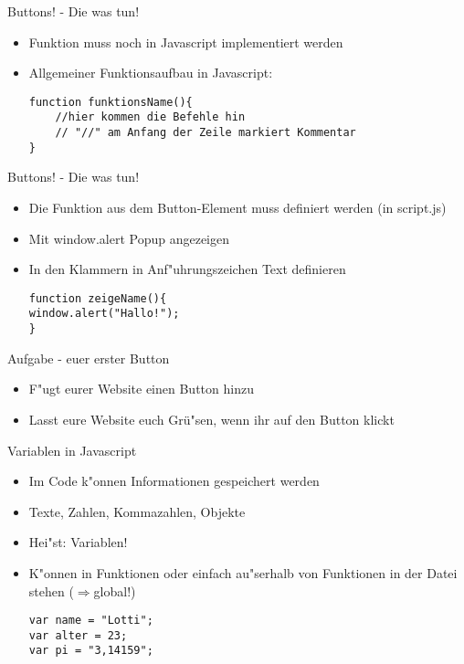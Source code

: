 \documentclass[18pt]{beamer}
\begin{document}
\begin{frame}[fragile]{Buttons! - Die was tun!}
\begin {itemize}
\item Funktion muss noch in Javascript implementiert werden
\item Allgemeiner Funktionsaufbau in Javascript:
\begin{lstlisting}
function funktionsName(){
	//hier kommen die Befehle hin
	// "//" am Anfang der Zeile markiert Kommentar
}
\end{lstlisting}
\end {itemize}
\end{frame}




\begin{frame}[fragile]{Buttons! - Die was tun!}
\begin {itemize}
\item Die Funktion aus dem Button-Element muss definiert werden (in script.js)
\item  Mit window.alert Popup angezeigen
\item In den Klammern in Anf"uhrungszeichen Text definieren
\begin{lstlisting}
function zeigeName(){
window.alert("Hallo!");
}
\end{lstlisting}
\end {itemize}
\end{frame}



\begin{frame}[fragile]{Aufgabe - euer erster Button}
\begin {itemize}
\item F"ugt eurer Website einen Button hinzu
\item Lasst eure Website euch Grü"sen, wenn ihr auf den Button klickt
\end {itemize}
\end{frame}


\begin{frame}[fragile]{Variablen in Javascript}
\begin{itemize}
\item Im Code k"onnen Informationen gespeichert werden
\item Texte, Zahlen, Kommazahlen, Objekte
\item Hei"st: Variablen! 
\item K"onnen in Funktionen oder einfach au"serhalb von Funktionen in der Datei stehen ($\Rightarrow$global!)
\begin{lstlisting}
var name = "Lotti";
var alter = 23;
var pi = "3,14159";
\end{lstlisting}
\end{itemize}
\end{frame}
\end{document}
